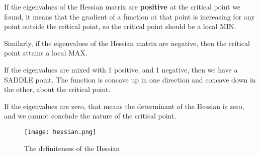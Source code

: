 \documentclass[10pt,a4paper]{book}
\theoremstyle{definition}\newtheorem{definition}{Definition}
\theoremstyle{definition}\newtheorem{fact}{Fact}
\theoremstyle{definition}\newtheorem{ex}{Ex.}
\theoremstyle{definition}\newtheorem{project}{Project}
\theoremstyle{definition}\newtheorem{problem}{Problem}
\theoremstyle{definition}\newtheorem{example}{Example}
\numberwithin{theorem}{chapter}
\numberwithin{corollary}{chapter}
\numberwithin{assumption}{chapter}
\numberwithin{definition}{chapter}
\numberwithin{prop}{chapter}
\numberwithin{notation}{chapter}
\numberwithin{problem}{chapter}
\numberwithin{example}{chapter}
\numberwithin{fact}{chapter}
\numberwithin{ex}{chapter}
\begin{document}
	If the eigenvalues of the Hessian matrix are \textbf{positive} at the critical point we found, it means that the gradient of a function at that point is increasing for any point outside the critical point, so the critical point should be a local MIN. 
	
	Similarly, if the eigenvalues of the Hessian matrix are negative, then the critical point attains a local MAX. 
	
	If the eigenvalues are mixed with 1 positive, and 1 negative, then we have a SADDLE point. The function is concave up in one direction and concave down in the other, about the critical point. 
	
	If the eigenvalues are zero, that means the determinant of the Hessian is zero, and we cannot conclude the nature of the critical point.
	
	\begin{figure}[ht]
		\centering
		\texttt{[image: hessian.png]}
		\caption{The definiteness of the Hessian}
	\end{figure}
	
\end{document}
